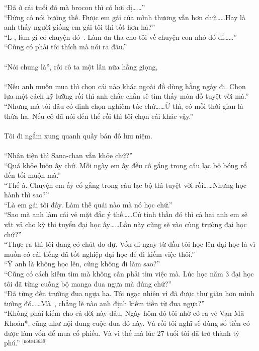 \documentclass[12pt,a4paper, twosides]{book}
\begin{document}
“Đã ở cái tuổi đó mà brocon thì có hơi dị……”\\
“Đừng có nói bướng thế. Được em gái của mình thương vẫn hơn chứ……Hay là anh thấy người giống em gái tôi thì tốt hơn hả?”\\
“L-, làm gì có chuyện đó~. Làm ơn tha cho tôi về chuyện con nhỏ đó đi……”\\
“Cũng có phải tôi thích mà nói ra đâu.”\\
\\
“Nói chung là”, rồi cô ta một lần nữa hắng giọng,\\
\\
“Nếu anh muốn mua thì chọn cái nào khác ngoài đồ dùng hằng ngày đi. Chọn lựa một cách kỹ lưỡng rồi thì anh chắc chắn sẽ tìm thấy món đồ tuyệt vời mà.”\\
“Nhưng mà tôi đâu có định chọn nghiêm túc chứ……Ừ thì, có mỗi thời gian là thừa ha. Nếu cô đã nói đến thế rồi thì tôi chọn cái khác vậy.”\\
\\
Tôi đi ngắm xung quanh quầy bán đồ lưu niệm.\\
\\
“Nhân tiện thì Sana-chan vẫn khỏe chứ?”\\
“Quá khỏe luôn ấy chứ. Mỗi ngày em ấy đều cố gắng trong câu lạc bộ bóng rổ đến tối muộn mà.”\\
“Thế à. Chuyện em ấy cố gắng trong câu lạc bộ thì tuyệt vời rồi……Nhưng học hành thì sao?”\\
“Là em gái tôi đấy. Làm thế quái nào mà nó học chứ.”\\
“Sao mà anh làm cái vẻ mặt đắc ý thế……Cứ tinh thần đó thì cả hai anh em sẽ vất vả cho kỳ thi tuyển đại học ấy……Lần này cũng sẽ vào cùng trường đại học chứ?”\\
“Thực ra thì tôi đang có chút do dự. Vốn dĩ ngay từ đầu tôi học lên đại học là vì muốn có cái tiếng đã tốt nghiệp đại học để đi kiếm việc thôi.”\\
“Ý anh là không học lên, cũng không đi làm sao?”\\
“Cũng có cách kiếm tìm mà không cần phải tìm việc mà. Lúc học năm 3 đại học tôi đã từng cuồng bộ manga đua ngựa mà đúng chứ?”\\
“Đã từng đến trường đua ngựa ha. Tôi ngạc nhiên vì đã được thư giãn hơn mình tưởng đó……Mà~, chẳng lẽ nào anh định kiếm tiền từ đua ngựa?”\\
“Không phải kiếm cho cả đời này đâu. Ngày hôm đó tôi nhớ có ra vé Vạn Mã Khoán*, cũng như nội dung cuộc đua đó này. Và rồi tôi nghĩ sẽ dùng số tiền có được làm vốn để mua cổ phiếu. Và vì thế mà lúc 27 tuổi tôi đã trở thành tỷ phú.” $^\text{[note43639]}$\\
\end{document}
